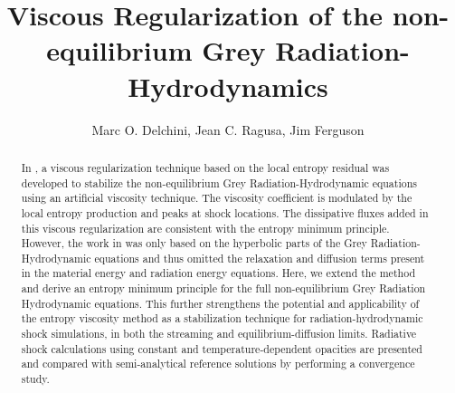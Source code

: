 \documentclass[times,doublespace]{fldauth}%
\begin{document}
%


\title{Viscous Regularization of the non-equilibrium Grey Radiation-Hydrodynamics}

\author{Marc O. Delchini, Jean C. Ragusa\corrauth{}, Jim Ferguson}

\address{Department of Nuclear Engineering, Texas A\&M University, College Station, TX 77843, USA}


\begin{abstract}
In \cite{our_jcp_radhy_paper}, a viscous regularization technique based on the local entropy residual was
developed to stabilize the non-equilibrium Grey Radiation-Hydrodynamic equations using an artificial viscosity technique. 
The viscosity coefficient is modulated by the local entropy production and peaks at shock locations. 
The dissipative fluxes added in this viscous regularization are consistent with the entropy minimum principle. 
However, the work in \cite{our_jcp_radhy_paper} was only based on the hyperbolic parts
of the Grey Radiation-Hydrodynamic equations and thus omitted the relaxation and diffusion terms 
present in the material energy and radiation energy equations. 
%
Here, we extend the method and derive an entropy minimum principle for the full non-equilibrium Grey Radiation Hydrodynamic 
equations. This further strengthens the potential and applicability of the entropy viscosity method as a stabilization technique 
for radiation-hydrodynamic shock simulations, in both the streaming and equilibrium-diffusion limits. 
Radiative shock calculations using constant and temperature-dependent opacities are presented and 
compared with semi-analytical reference solutions by performing a convergence study. %
\end{abstract}
\end{document}
